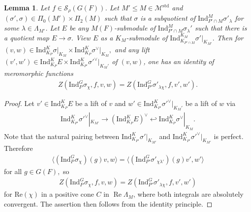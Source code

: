 \documentclass[10pt]{amsart}
\newtheorem{lemma}[theorem]{Lemma}
\theoremstyle{definition}
\numberwithin{equation}{section}
\numberwithin{equation}{subsection}
\newcommand{\Ind}{\mathrm{Ind}}
\renewcommand{\Im}{\mathop{\mathrm{Im}}}
\renewcommand{\Re}{\mathop{\mathrm{Re}}}
\begin{document}
\begin{lemma}\label{lem:cs:subquo} Let $f\in \mathcal{S}_\rho(G(F))$. Let $M'\le M\in\mathcal{M}^{\mathrm{std}}$ and $(\sigma',\sigma)\in\Pi_0(M')\times \Pi_2(M)$ such that $\sigma$ is a subquotient of $\mathrm{Ind}_{P'\cap M}^{M} \sigma'_{\lambda}$ for some $\lambda\in \Lambda_{M'}$. Let $E$ be any $M(F)$-submodule of $ \mathrm{Ind}_{P'\cap M}^{M} \sigma_{\lambda}'$ such that there is a quotient map $E\to \sigma.$ View $E$ as a $K_M$-submodule of $\mathrm{Ind}_{K_{P'\cap M}}^{K_M} \sigma'|_{K_{M'}}.$ Then for $(v,w)\in \Ind_{K_P}^K\sigma\vert_{K_M}\times \Ind_{K_P}^K\sigma^\vee\vert_{K_M},$ and any lift $(v',w')\in \mathrm{Ind}_{K_P}^{K} E\times \mathrm{Ind}_{K_{P'}}^K \sigma'^\vee|_{K_M'}$ of $(v,w)$, one has an identity of meromorphic functions
    \begin{align*}
            Z(\mathrm{Ind}_P^G \sigma_\chi, f,v,w)=Z(\mathrm{Ind}_{P'}^G \sigma'_{\lambda\chi}, f,v',w').
    \end{align*}
\end{lemma}
\begin{proof} 

Let $v'\in \mathrm{Ind}_{K_P}^K E$ be a lift of $v$ and $w'\in \mathrm{Ind}_{K_{P'}}^K \sigma'^\vee|_{K_M'}$ be a lift of $w$ via
\begin{align*}
    \Ind_{K_{P'}}^K\sigma'^\lor|_{K_{M'}}\longrightarrow (\mathrm{Ind}_{K_P}^K E)^\lor \hookleftarrow \mathrm{Ind}_{K_P}^K \sigma^\lor|_{K_M}.
\end{align*}
Note that the natural pairing between $\mathrm{Ind}_{K_{P'}}^K\sigma'|_{K_{M'}}$ and $\mathrm{Ind}_{K_{P'}}^K\sigma'^\lor|_{K_{M'}}$ is perfect. Therefore
\begin{align*}
    \langle (\mathrm{Ind}_P^G\sigma_\chi)(g) v,w\rangle=\langle (\mathrm{Ind}_{P'}^G\sigma'_{\chi\lambda'})(g)v',w'\rangle
\end{align*}
for all $g\in G(F),$ so
   \begin{align*}
            Z(\mathrm{Ind}_P^G \sigma_\chi, f,v,w)=Z(\mathrm{Ind}_{P'}^G \sigma'_{\lambda\chi}, f,v',w')
    \end{align*}
for $\mathrm{Re}(\chi)$ in a positive cone $C$ in $\Re\Lambda_M$, where both integrals are absolutely convergent. The assertion then follows from the identity principle.
\end{proof}
\end{document}
